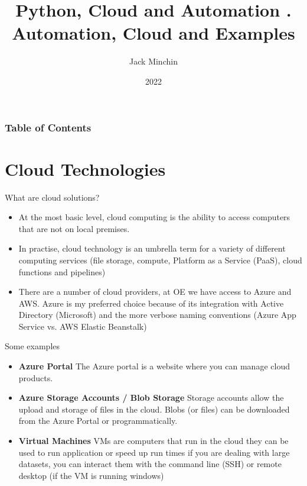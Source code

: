\documentclass[aspectratio=169]{beamer}
\title{\large{\textbf{Python, Cloud and Automation}} \newline\newline 3. Automation, Cloud and Examples}
\author{Jack Minchin}
\institute{Tourism Economics}
\date{2022}
\begin{document}
\frame{\titlepage}

\begin{frame}
\frametitle{Table of Contents}
\tableofcontents
\end{frame}


\section{Cloud Technologies}

\begin{frame}{What are cloud solutions?}

\begin{itemize}
	\item At the most basic level, cloud computing is the ability to access computers that are not on local premises. 
	\item In practise, cloud technology is an umbrella term for a variety of different computing services (file storage, compute, Platform as a Service (PaaS), cloud functions and pipelines)
	\item There are a number of cloud providers, at OE we have access to Azure and AWS. Azure is my preferred choice because of its integration with Active Directory (Microsoft) and the more verbose naming conventions (Azure App Service vs. AWS Elastic Beanstalk)
\end{itemize}

\end{frame}

\begin{frame}{Some examples}

\begin{itemize}
	\item \textbf{Azure Portal} The Azure portal is a website where you can manage cloud products.
	\item \textbf{Azure Storage Accounts / Blob Storage} Storage accounts allow the upload and storage of files in the cloud. Blobs (or files) can be downloaded from the Azure Portal or programmatically.
	\item \textbf{Virtual Machines} VMs are computers that run in the cloud they can be used to run application or speed up run times if you are dealing with large datasets, you can interact them with the command line (SSH) or remote desktop (if the VM is running windows)
\end{itemize}
	
\end{frame}
\end{document}
